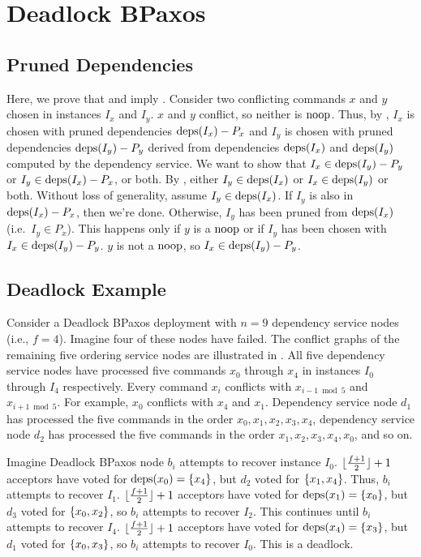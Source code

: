 \section{Deadlock BPaxos}
\subsection{Pruned Dependencies}
Here, we prove that  and 
imply .
%
Consider two conflicting commands $x$ and $y$ chosen in instances $I_x$ and
$I_y$. $x$ and $y$ conflict, so neither is $\text{noop}$. Thus, by
, $I_x$ is chosen with pruned dependencies
$\text{deps}(I_x) - P_x$ and $I_y$ is chosen with pruned dependencies $\text{deps}(I_y) -
P_y$ derived from dependencies $\text{deps}(I_x)$ and $\text{deps}(I_y)$ computed by the
dependency service. We want to show that $I_x \in \text{deps}(I_y) - P_y$ or $I_y \in
\text{deps}(I_x) - P_x$, or both.
%
By , either $I_y \in \text{deps}(I_x)$ or $I_x \in
\text{deps}(I_y)$ or both. Without loss of generality, assume $I_y \in \text{deps}(I_x)$.
If $I_y$ is also in $\text{deps}(I_x) - P_x$, then we're done. Otherwise, $I_y$ has
been pruned from $\text{deps}(I_x)$ (i.e.\ $I_y \in P_x$). This happens only if $y$
is a $\text{noop}$ or if $I_y$ has been chosen with $I_x \in \text{deps}(I_y) - P_y$. $y$
is not a $\text{noop}$, so $I_x \in \text{deps}(I_y) - P_y$.

\subsection{Deadlock Example}
Consider a Deadlock BPaxos deployment with $n = 9$ dependency service nodes
(i.e., $f = 4$). Imagine four of these nodes have failed. The conflict graphs
of the remaining five ordering service nodes are illustrated in
. All five dependency service nodes have
processed five commands $x_0$ through $x_4$ in instances $I_0$ through $I_4$
respectively. Every command $x_i$ conflicts with $x_{i - 1 \bmod 5}$ and $x_{i
+ 1 \bmod 5}$. For example, $x_0$ conflicts with $x_4$ and $x_1$. Dependency
service node $d_1$ has processed the five commands in the order $x_0, x_1, x_2,
x_3, x_4$, dependency service node $d_2$ has processed the five commands in the
order $x_1, x_2, x_3, x_4, x_0$, and so on.

{}

Imagine Deadlock BPaxos node $b_i$ attempts to recover instance $I_0$.
$\lfloor\frac{f + 1}{2}\rfloor + 1$ acceptors have voted for $\text{deps}(x_0) = \{x_4\}$, but
$d_2$ voted for $\{x_1, x_4\}$. Thus, $b_i$ attempts to recover $I_1$.
$\lfloor\frac{f + 1}{2}\rfloor + 1$ acceptors have voted for $\text{deps}(x_1) = \{x_0\}$, but
$d_3$ voted for $\{x_0, x_2\}$, so $b_i$ attempts to recover $I_2$. This
continues until $b_i$ attempts to recover $I_4$.  $\lfloor\frac{f + 1}{2}\rfloor + 1$
acceptors have voted for $\text{deps}(x_4) = \{x_3\}$, but $d_1$ voted for
$\{x_0, x_3\}$, so $b_i$ attempts to recover $I_0$. This is a deadlock.
